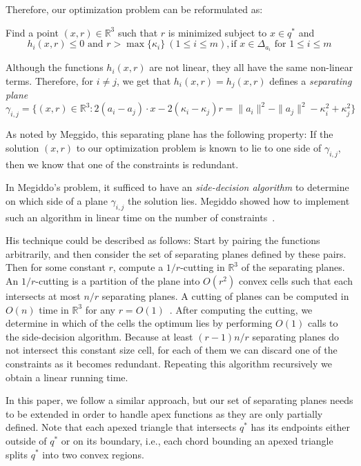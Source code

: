 \documentclass[a4paper,UKenglish]{lipics}
\begin{document}
Therefore, our optimization problem can be reformulated as:

Find a point $(x,r)\in \mathbb{R}^3$ such that $r$ is minimized subject to $x\in q^*$ and 
$$h_i(x, r) \leq 0 \text{ and } r > \max\{\kappa_i\}\ (1\leq i\leq m), \text{if $x\in \Delta_{a_i}$ for $1\leq i \leq m$}$$

Although the functions $h_i(x,r)$ are not linear, they all have the same non-linear terms. Therefore, for $i\neq j$, we get that
$h_i(x,r) = h_j(x, r)$ defines a \emph{separating plane}
$$\gamma_{i,j} = \{(x, r) \in \mathbb{R}^3: 2 (a_i - a_j) \cdot x - 2( \kappa_i - \kappa_j) r = \|a_i\|^2 - \|a_j\|^2 - \kappa_i^2 + \kappa_j^2\}$$

As noted by Meggido, this separating plane has the following property:
If the solution $(x, r)$ to our optimization problem is known to lie to one side of $\gamma_{i,j}$, then we know that one of the constraints is redundant. 

In Megiddo's problem, it sufficed to have an \emph{side-decision algorithm} to determine on which side of a plane $\gamma_{i,j}$ the solution lies. Megiddo showed how to implement such an algorithm in linear time on the number of constraints~\cite{megiddo1989ball}.

His technique could be described as follows: Start by pairing the functions arbitrarily, and then consider the set of separating planes defined by these pairs.
Then for some constant $r$, compute a $1/r$-cutting in $\mathbb{R}^3$ of the separating planes.
An $1/r$-cutting is a partition of the plane into $O(r^2)$ convex cells such that each intersects at most $n/r$ separating planes.
A cutting of planes can be computed in $O(n)$ time in $\mathbb{R}^3$ for any $r = O(1)$~\cite{matousekCuttings}.
After computing the cutting, we determine in which of the cells the optimum lies by performing $O(1)$ calls to the side-decision algorithm. 
Because at least $(r-1)n/r$ separating planes do not intersect this constant size cell, for each of them we can discard one of the constraints as it becomes redundant. Repeating this algorithm recursively we obtain a linear running time.

In this paper, we follow a similar approach, but our set of separating planes needs to be extended in order to handle apex functions as they are only partially defined.
Note that each apexed triangle that intersects $q^*$ has its endpoints either outside of $q^*$ or on its boundary, i.e., each chord bounding an apexed triangle splits $q^*$ into two convex regions.
\end{document}
